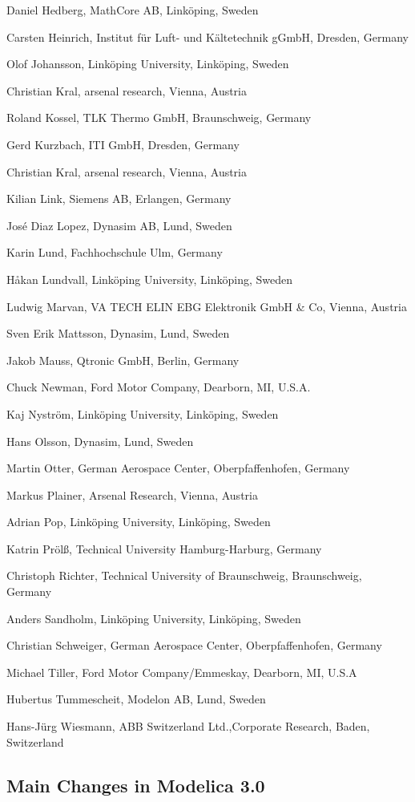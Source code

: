 Daniel Hedberg, MathCore AB, Linköping, Sweden

Carsten Heinrich, Institut für Luft- und Kältetechnik gGmbH, Dresden,
Germany

Olof Johansson, Linköping University, Linköping, Sweden

Christian Kral, arsenal research, Vienna, Austria

Roland Kossel, TLK Thermo GmbH, Braunschweig, Germany

Gerd Kurzbach, ITI GmbH, Dresden, Germany

Christian Kral, arsenal research, Vienna, Austria

Kilian Link, Siemens AB, Erlangen, Germany

José Diaz Lopez, Dynasim AB, Lund, Sweden

Karin Lund, Fachhochschule Ulm, Germany

Håkan Lundvall, Linköping University, Linköping, Sweden

Ludwig Marvan, VA TECH ELIN EBG Elektronik GmbH \& Co, Vienna, Austria

Sven Erik Mattsson, Dynasim, Lund, Sweden

Jakob Mauss, Qtronic GmbH, Berlin, Germany

Chuck Newman, Ford Motor Company, Dearborn, MI, U.S.A.

Kaj Nyström, Linköping University, Linköping, Sweden

Hans Olsson, Dynasim, Lund, Sweden

Martin Otter, German Aerospace Center, Oberpfaffenhofen, Germany

Markus Plainer, Arsenal Research, Vienna, Austria

Adrian Pop, Linköping University, Linköping, Sweden

Katrin Prölß, Technical University Hamburg-Harburg, Germany

Christoph Richter, Technical University of Braunschweig, Braunschweig,
Germany

Anders Sandholm, Linköping University, Linköping, Sweden

Christian Schweiger, German Aerospace Center, Oberpfaffenhofen, Germany

Michael Tiller, Ford Motor Company/Emmeskay, Dearborn, MI, U.S.A

Hubertus Tummescheit, Modelon AB, Lund, Sweden

Hans-Jürg Wiesmann, ABB Switzerland Ltd.,Corporate Research, Baden,
Switzerland

\subsection{Main Changes in Modelica 3.0}\label{main-changes-in-modelica-3-0}

